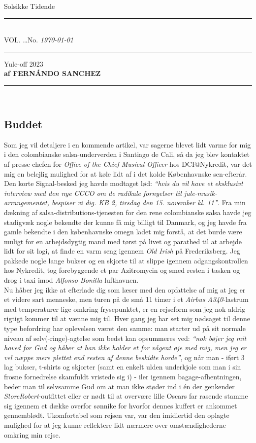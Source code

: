 \documentclass[danish]{article}
\date{\today}
\def\papername{Solsikke Tidende}
\def\paperlocation{København}
\newcounter{volumeno}
\newcounter{issueno}
\renewcommand{\maketitle}{
  \thispagestyle{empty}
  \vspace*{-40pt}
  \begin{center}
  \hfill
  {\textgoth
   {\huge 
     \usefont{LYG}{bigygoth}{m}{n} \papername
   }
  }\hfill%
  \raisebox{12pt}{
   \textbf{
    \footnotesize 
    \paperlocation
   }
  }\\
  \vspace*{0.1in}
  \rule[0pt]{\textwidth}{0.5pt}\\
  {\small 
    VOL.\MakeUppercase{\roman{volumeno}}
    \ldots No. \arabic{issueno}
   } \hfill 
   \MakeUppercase{\small \textit \today} 
   \hfill {\small }\\
  \rule[6pt]{\textwidth}{1.2pt}
  \end{center}
  \pagestyle{plain}
}
\newcommand\byline[2]{
  {\fontfamily{lmdh}\selectfont
  \begin{center} #1 \\%
  {\footnotesize\bf af \MakeUppercase{#2}} \\ %
  \rule[3pt]{0.4\hsize}{0.5pt}\\ \end{center} \par
  }
}
\begin{document}
\maketitle
{}\selectfont

\begin{multicols}{2}
\byline{Yule-off 2023}{Fernándo Sanchez}
\subsection*{Buddet}
Som jeg vil detaljere i en kommende artikel, var sagerne blevet lidt varme for mig i den colombianske salsa-underverden i Santiago de Cali, så da jeg blev kontaktet af presse-chefen for \textit{Office of the Chief Musical Officer} hos DCI@Nykredit, var det mig en belejlig mulighed for at køle lidt af i det kolde Københavnske sen-efterår. 
Den korte Signal-besked jeg havde modtaget lød: \textit{``hvis du vil have et eksklusivt interview med den nye CCCO om de radikale fornyelser til jule-musik-arrangementet, bespiser vi dig. KB 2, tirsdag den 15. november kl. 11''}. 
Fra min dækning af salsa-distributions-tjenesten for den rene colombianske salsa havde jeg stadigvæk nogle bekendte der kunne få mig billigt til Danmark, og jeg havde fra gamle bekendte i den københavnske omegn ladet mig forstå, at det burde være muligt for en arbejdsdygtig mand med tørst på livet og parathed til at arbejde lidt for sit logi, at finde en varm seng igennem \textit{Old Irish} på Frederiksberg. Jeg pakkede nogle lange bukser og en skjorte til at slippe igennem adgangskontrollen hos Nykredit,  tog forebyggende et par Azitromycin og smed resten i tasken og drog i taxi imod \textit{Alfonso Bonilla} lufthavnen.\\

Nu håber jeg ikke at efterlade dig som læser med den opfattelse af mig at jeg er et videre sart menneske, men turen på de små 11 timer i et \textit{Airbus A340}-lastrum med temperaturer lige omkring frysepunktet, er en rejseform som jeg nok aldrig rigtigt kommer til at vænne mig til. Hver gang jeg har set mig nødsaget til denne type befordring har oplevelsen været den samme: man starter ud på sit normale niveau af selv(-ringe)-agtelse som bedst kan opsummeres ved: \textit{``nok bøjer jeg mit hoved for Gud og håber at han ikke holder et for vågent øje med mig, men jeg er vel næppe mere plettet end resten af denne beskidte horde''}, og når man - iført 3 lag bukser, t-shirts og skjorter (samt en enkelt ulden underkjole som man i sin frosne fornedrelse skamfuldt vristede sig i) - iler igennem bagage-afhentningen, beder man til selvsamme Gud om at man ikke støder ind i én der genkender \textit{StoreRobert}-outfittet eller er nødt til at overvære lille Oscars far rasende stamme sig igennem et dække overfor sønnike for hvorfor dennes kuffert er ankommet gennemblødt. Ukomfortabel som rejsen var, var den imidlertid den oplagte mulighed for at jeg kunne reflektere lidt nærmere over omstændighederne omkring min rejse.\\


\end{multicols}
\end{document}
